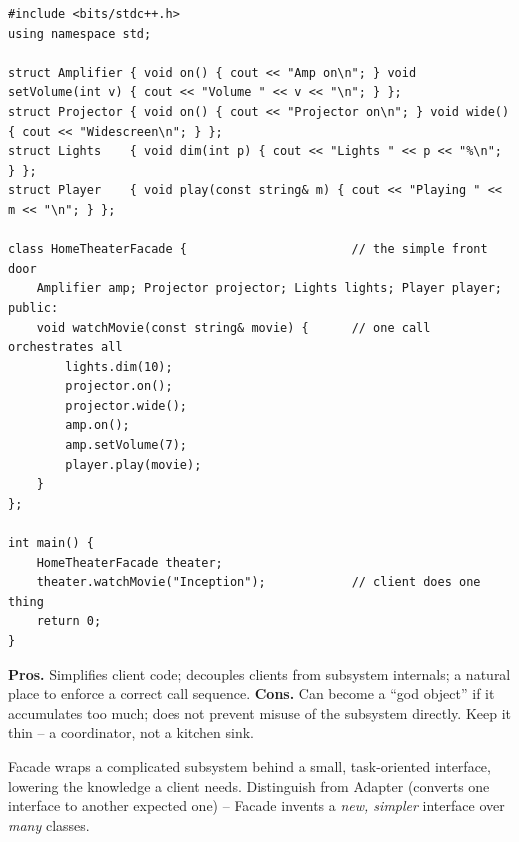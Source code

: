 \begin{lstlisting}
#include <bits/stdc++.h>
using namespace std;

struct Amplifier { void on() { cout << "Amp on\n"; } void setVolume(int v) { cout << "Volume " << v << "\n"; } };
struct Projector { void on() { cout << "Projector on\n"; } void wide() { cout << "Widescreen\n"; } };
struct Lights    { void dim(int p) { cout << "Lights " << p << "%\n"; } };
struct Player    { void play(const string& m) { cout << "Playing " << m << "\n"; } };

class HomeTheaterFacade {                       // the simple front door
    Amplifier amp; Projector projector; Lights lights; Player player;
public:
    void watchMovie(const string& movie) {      // one call orchestrates all
        lights.dim(10);
        projector.on();
        projector.wide();
        amp.on();
        amp.setVolume(7);
        player.play(movie);
    }
};

int main() {
    HomeTheaterFacade theater;
    theater.watchMovie("Inception");            // client does one thing
    return 0;
}
\end{lstlisting}

\begin{complexitybox}
\textbf{Pros.} Simplifies client code; decouples clients from subsystem
internals; a natural place to enforce a correct call sequence.
\textbf{Cons.} Can become a ``god object'' if it accumulates too much;
does not prevent misuse of the subsystem directly. Keep it thin -- a
coordinator, not a kitchen sink.
\end{complexitybox}

\begin{takeawaybox}
Facade wraps a complicated subsystem behind a small, task-oriented
interface, lowering the knowledge a client needs. Distinguish from
Adapter (converts one interface to another expected one) -- Facade invents
a \emph{new, simpler} interface over \emph{many} classes.
\end{takeawaybox}
